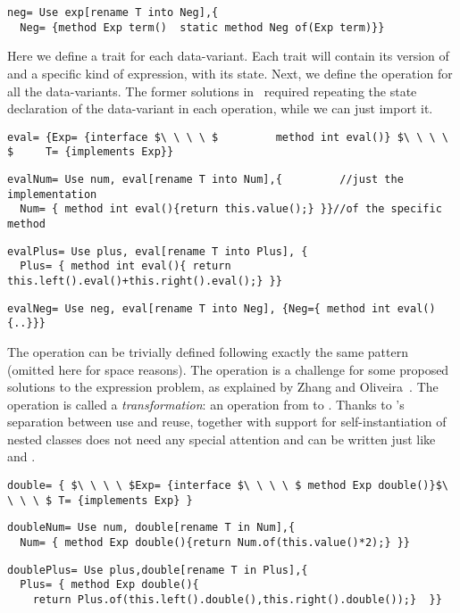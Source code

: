 \begin{lstlisting}
neg= Use exp[rename T into Neg],{
  Neg= {method Exp term()  static method Neg of(Exp term)}}
\end{lstlisting}
Here we define a trait for each data-variant.
Each trait will contain its version of \Q@Exp@
and a specific kind of expression, with its state.
Next, we define the operation \Q@eval@ for all the data-variants.
The former solutions in~\cite{deep}
required repeating the state declaration of the 
data-variant in each operation, while we can just import it.
\begin{lstlisting}
eval= {Exp= {interface $\ \ \ \ $         method int eval()} $\ \ \ \ $     T= {implements Exp}}
\end{lstlisting}
\multiCode
\begin{lstlisting}
evalNum= Use num, eval[rename T into Num],{         //just the implementation
  Num= { method int eval(){return this.value();} }}//of the specific method
\end{lstlisting}
\multiCode
\begin{lstlisting}
evalPlus= Use plus, eval[rename T into Plus], {
  Plus= { method int eval(){ return this.left().eval()+this.right().eval();} }}
\end{lstlisting}
\multiCode
\begin{lstlisting}
evalNeg= Use neg, eval[rename T into Neg], {Neg={ method int eval(){..}}}
\end{lstlisting}
The \Q@show@ operation can be trivially defined
following exactly the same pattern (omitted here for space reasons).
The operation \Q@double@ is a challenge for some proposed solutions
to the expression problem, as explained by Zhang and Oliveira~\cite{zhang2017evf}.
The \Q@double@ operation is called a \emph{transformation}: an operation from \Q@Exp@ to \Q@Exp@.
Thanks to \name's separation between use and reuse,
together with support
for self-instantiation of nested classes
\Q@double@ does not need any special attention
and can be written just like \Q@eval@ and \Q@show@.
\begin{lstlisting}
double= { $\ \ \ \ $Exp= {interface $\ \ \ \ $ method Exp double()}$\ \ \ \ $ T= {implements Exp} }
\end{lstlisting}
\multiCode
\begin{lstlisting}
doubleNum= Use num, double[rename T in Num],{
  Num= { method Exp double(){return Num.of(this.value()*2);} }}
\end{lstlisting}
\multiCode
\begin{lstlisting}
doublePlus= Use plus,double[rename T in Plus],{
  Plus= { method Exp double(){
    return Plus.of(this.left().double(),this.right().double());}  }}
\end{lstlisting}
